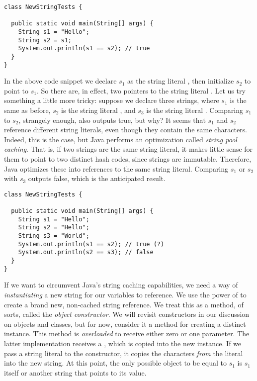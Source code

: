 \begin{cl}{}
\begin{lstlisting}[language=MyJava]
class NewStringTests {

  public static void main(String[] args) {
    String s1 = "Hello";
    String s2 = s1;
    System.out.println(s1 == s2); // true
  }
}
\end{lstlisting}
\end{cl}

In the above code snippet we declare $s_1$ as the string literal , then initialize $s_2$ to point to $s_1$. So there are, in effect, two pointers to the string literal . Let us try something a little more tricky: suppose we declare three strings, where $s_1$ is the same as before, $s_2$ is the string literal , and $s_3$ is the string literal . Comparing $s_1$ to $s_2$, strangely enough, also outputs true, but why? It seems that $s_1$ and $s_2$ reference different string literals, even though they contain the same characters. Indeed, this is the case, but Java performs an optimization called \textit{string pool caching}. That is, if two strings are the same string literal, it makes little sense for them to point to two distinct hash codes, since strings are immutable. Therefore, Java optimizes these into references to the same string literal. Comparing $s_1$ or $s_2$ with $s_3$ outputs false, which is the anticipated result.

\begin{cl}{}
\begin{lstlisting}[language=MyJava]
class NewStringTests {

  public static void main(String[] args) {
    String s1 = "Hello";
    String s2 = "Hello";
    String s3 = "World";
    System.out.println(s1 == s2); // true (?)
    System.out.println(s2 == s3); // false
  }
}
\end{lstlisting}
\end{cl}

If we want to circumvent Java's string caching capabilities, we need a way of \textit{instantiating} a new string for our variables to reference. We use the power of  to create a brand new, non-cached string reference. We treat this as a method, of sorts, called the \textit{object constructor}. We will revisit constructors in our discussion on objects and classes, but for now, consider it a method for creating a distinct  instance. This method is \textit{overloaded} to receive either zero or one parameter. The latter implementation receives a , which is copied into the new  instance. If we pass a string literal to the constructor, it copies the characters \textit{from} the literal into the new string. At this point, the only possible object to be equal to $s_1$ is $s_1$ itself or another string that points to its value.

